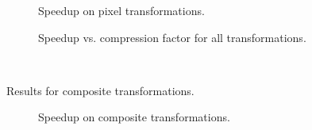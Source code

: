 \begin{figure}[t]
\caption{Speedup on pixel transformations.
\protect\label{fig:pixel-speedup}}
\end{figure}

\begin{figure}[t]
\caption{Speedup vs. compression factor for all transformations.
\protect\label{fig:speedup-scatter}}
\end{figure}

\begin{table*}[t]
\begin{minipage}{0.8in}
\mbox{~}
\end{minipage}
\caption{Results for composite transformations.
\protect\label{tab:composite-speedup}}
\end{table*}

\begin{figure}[t]
\caption{Speedup on composite transformations.
\protect\label{fig:composite-speedup}}
\end{figure}

